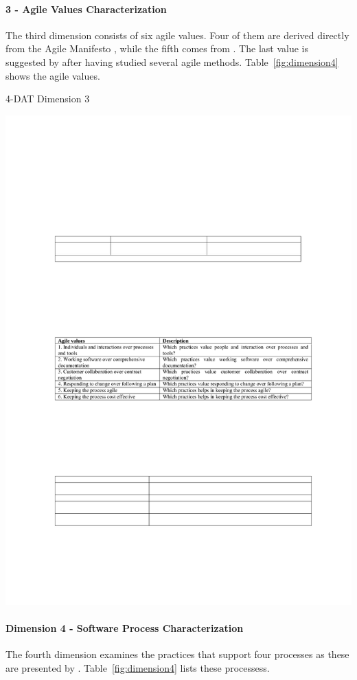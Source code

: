 \paragraph{3 - Agile Values Characterization}
The third dimension consists of six agile values. Four of them are derived directly from the Agile Manifesto \cite{beck2001agile}, while the fifth comes from \cite{koch2005agile}. The last value is suggested by \citet{qumer2006measuring} after having studied several agile methods. Table~\ref{fig:dimension4} shows the agile values.

\begin{table}[H]
\caption{4-DAT Dimension 3}
\label{fig:dimension3}
\centerline{\includegraphics[scale=0.8]{include/relatedwork/fig/qumer_dimension3.pdf}}
\end{table}

\paragraph{Dimension 4 - Software Process Characterization}
The fourth dimension examines the practices that support four processes as these are presented by \citet{qumer2006measuring}. Table~\ref{fig:dimension4} lists these processess.

